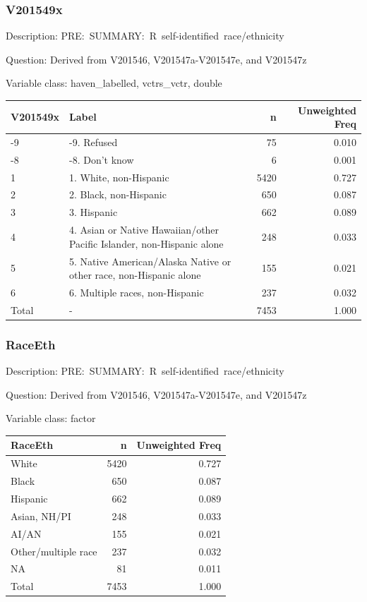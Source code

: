 \documentclass[
]{krantz}
\begin{document}
\hypertarget{v201549x}{%
\subsubsection*{V201549x}\label{v201549x}}


Description: PRE:~SUMMARY:~R~self-identified~race/ethnicity

Question: Derived from V201546, V201547a-V201547e, and V201547z

Variable class: haven\_labelled, vctrs\_vctr, double

\begin{tabular}[t]{l|l|r|r}
\hline
V201549x & Label & n & Unweighted Freq\\
\hline
-9 & -9. Refused & 75 & 0.010\\
\hline
-8 & -8. Don't know & 6 & 0.001\\
\hline
1 & 1. White, non-Hispanic & 5420 & 0.727\\
\hline
2 & 2. Black, non-Hispanic & 650 & 0.087\\
\hline
3 & 3. Hispanic & 662 & 0.089\\
\hline
4 & 4. Asian or Native Hawaiian/other Pacific Islander, non-Hispanic alone & 248 & 0.033\\
\hline
5 & 5. Native American/Alaska Native or other race, non-Hispanic alone & 155 & 0.021\\
\hline
6 & 6. Multiple races, non-Hispanic & 237 & 0.032\\
\hline
Total & - & 7453 & 1.000\\
\hline
\end{tabular}

\hypertarget{raceeth}{%
\subsubsection*{RaceEth}\label{raceeth}}


Description: PRE:~SUMMARY:~R~self-identified~race/ethnicity

Question: Derived from V201546, V201547a-V201547e, and V201547z

Variable class: factor

\begin{tabular}[t]{l|r|r}
\hline
RaceEth & n & Unweighted Freq\\
\hline
White & 5420 & 0.727\\
\hline
Black & 650 & 0.087\\
\hline
Hispanic & 662 & 0.089\\
\hline
Asian, NH/PI & 248 & 0.033\\
\hline
AI/AN & 155 & 0.021\\
\hline
Other/multiple race & 237 & 0.032\\
\hline
NA & 81 & 0.011\\
\hline
Total & 7453 & 1.000\\
\hline
\end{tabular}
\end{document}
